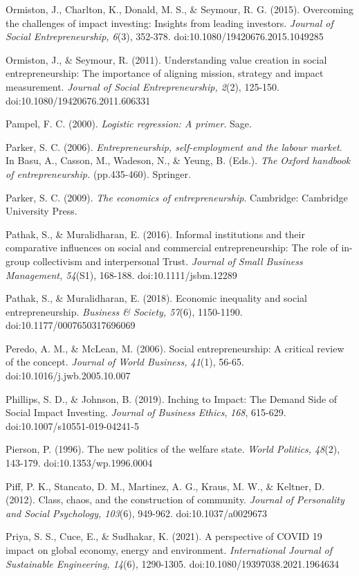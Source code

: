 \documentclass{article}
\begin{document}
Ormiston, J., Charlton, K., Donald, M. S., \& Seymour, R. G. (2015). Overcoming the challenges of impact investing: Insights from leading investors. \emph{Journal of Social Entrepreneurship, 6}(3), 352-378. doi:10.1080/19420676.2015.1049285

Ormiston, J., \& Seymour, R. (2011). Understanding value creation in social entrepreneurship: The importance of aligning mission, strategy and impact measurement. \emph{Journal of Social Entrepreneurship, 2}(2), 125-150. doi:10.1080/19420676.2011.606331

Pampel, F. C. (2000). \emph{Logistic regression: A primer}. Sage.

Parker, S. C. (2006). \emph{Entrepreneurship, self-employment and the labour market}. In Basu, A., Casson, M., Wadeson, N., \& Yeung, B. (Eds.). \emph{The} \emph{Oxford handbook of entrepreneurship. }(pp.435-460). Springer. 

Parker, S. C. (2009). \emph{The economics of entrepreneurship}. Cambridge: Cambridge University Press.

Pathak, S., \& Muralidharan, E. (2016). Informal institutions and their comparative influences on social and commercial entrepreneurship: The role of in-group collectivism and interpersonal Trust. \emph{Journal of Small Business Management, 54}(S1), 168-188. doi:10.1111/jsbm.12289

Pathak, S., \& Muralidharan, E. (2018). Economic inequality and social entrepreneurship. \emph{Business \& Society, 57}(6), 1150-1190. doi:10.1177/0007650317696069

Peredo, A. M., \& McLean, M. (2006). Social entrepreneurship: A critical review of the concept. \emph{Journal of World Business, 41}(1), 56-65. doi:10.1016/j.jwb.2005.10.007

Phillips, S. D., \& Johnson, B. (2019). Inching to Impact: The Demand Side of Social Impact Investing. \emph{Journal of Business Ethics}, \emph{168}, 615-629. doi:10.1007/s10551-019-04241-5

Pierson, P. (1996). The new politics of the welfare state. \emph{World Politics, 48}(2), 143-179. doi:10.1353/wp.1996.0004

Piff, P. K., Stancato, D. M., Martinez, A. G., Kraus, M. W., \& Keltner, D. (2012). Class, chaos, and the construction of community. \emph{Journal of Personality and Social Psychology, 103}(6), 949-962. doi:10.1037/a0029673

Priya, S. S., Cuce, E., \& Sudhakar, K. (2021). A perspective of COVID 19 impact on global economy, energy and environment. \emph{International Journal of Sustainable Engineering, 14}(6), 1290-1305. doi:10.1080/19397038.2021.1964634
\end{document}

